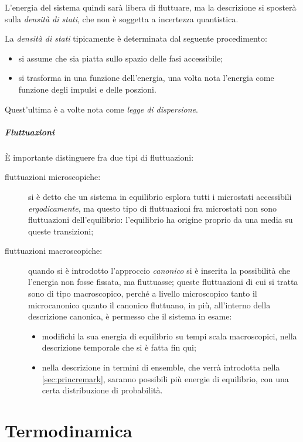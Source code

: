 L'energia del sistema quindi sarà libera di fluttuare, ma la descrizione si sposterà sulla \textit{densità di stati}, che non è soggetta a incertezza quantistica.

\begin{note}
	La \textit{densità di stati} tipicamente è determinata dal seguente procedimento:
	\begin{itemize}
		\item si assume che sia piatta sullo spazio delle fasi accessibile;
		\item si trasforma in una funzione dell'energia, una volta nota l'energia come funzione degli impulsi e delle poszioni.
	\end{itemize}
	Quest'ultima è a volte nota come \textit{legge di dispersione}.
\end{note}

\subparagraph{Fluttuazioni} \`E importante distinguere fra due tipi di fluttuazioni:
\begin{description}
	\item[fluttuazioni microscopiche:] si è detto che un sistema in equilibrio esplora tutti i microstati accessibili \textit{ergodicamente}, ma questo tipo di fluttuazioni fra microstati non sono fluttuazioni dell'equilibrio: l'equilibrio ha origine proprio da una media su queste transizioni;
	\item[fluttuazioni macroscopiche:] quando si è introdotto l'approccio \textit{canonico} si è inserita la possibilità che l'energia non fosse fissata, ma fluttuasse; queste fluttuazioni di cui si tratta sono di tipo macroscopico, perché a livello microscopico tanto il microcanonico quanto il canonico fluttuano, in più, all'interno della descrizione canonica, è permesso che il sistema in esame:
	\begin{itemize}
		\item modifichi la sua energia di equilibrio su tempi scala macroscopici, nella descrizione temporale che si è fatta fin qui;
		\item nella descrizione in termini di ensemble, che verrà introdotta nella \cref{sec:princremark}, saranno possibili più energie di equilibrio, con una certa distribuzione di probabilità.
	\end{itemize}
\end{description}


\section{Termodinamica}
\label{sec:termod}



